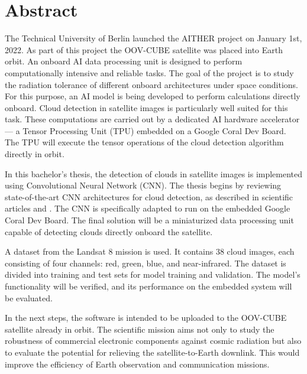 {\chapter*{Abstract}

The Technical University of Berlin launched the AITHER project on January 1st, 2022. As part of this project the OOV-CUBE satellite was placed into Earth orbit. An onboard AI data processing unit is designed to perform computationally intensive and reliable tasks. The goal of the project is to study the radiation tolerance of different onboard architectures under space conditions. For this purpose, an AI model is being developed to perform calculations directly onboard. Cloud detection in satellite images is particularly well suited for this task. These computations are carried out by a dedicated AI hardware accelerator --- a Tensor Processing Unit (TPU) embedded on a Google Coral Dev Board. The TPU will execute the tensor operations of the cloud detection algorithm directly in orbit.

In this bachelor's thesis, the detection of clouds in satellite images is implemented using Convolutional Neural Network (CNN). The thesis begins by reviewing state-of-the-art CNN architectures for cloud detection, as described in scientific articles \cite{CloudNet2019} and \cite{CloudDet2018}. The CNN is specifically adapted to run on the embedded Google Coral Dev Board. The final solution will be a miniaturized data processing unit capable of detecting clouds directly onboard the satellite.

A dataset from the Landsat 8 mission is used. It contains 38 cloud images, each consisting of four channels: red, green, blue, and near-infrared. The dataset is divided into training and test sets for model training and validation. The model's functionality will be verified, and its performance on the embedded system will be evaluated.

In the next steps, the software is intended to be uploaded to the OOV-CUBE satellite already in orbit. The scientific mission aims not only to study the robustness of commercial electronic components against cosmic radiation but also to evaluate the potential for relieving the satellite-to-Earth downlink. This would improve the efficiency of Earth observation and communication missions.

}